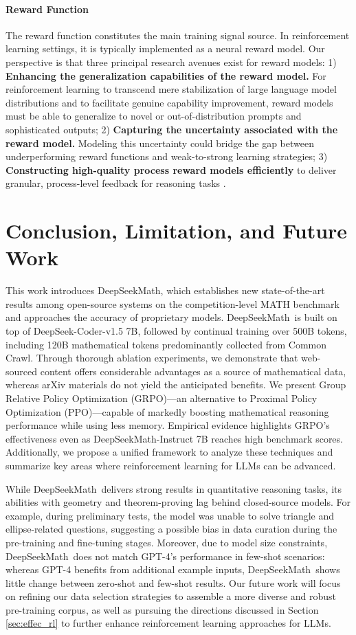 \paragraph{Reward Function} The reward function constitutes the main training signal source. In reinforcement learning settings, it is typically implemented as a neural reward model. Our perspective is that three principal research avenues exist for reward models: 1) \textbf{Enhancing the generalization capabilities of the reward model.} For reinforcement learning to transcend mere stabilization of large language model distributions and to facilitate genuine capability improvement, reward models must be able to generalize to novel or out-of-distribution prompts and sophisticated outputs; 2) \textbf{Capturing the uncertainty associated with the reward model.} Modeling this uncertainty could bridge the gap between underperforming reward functions and weak-to-strong learning strategies; 3) \textbf{Constructing high-quality process reward models efficiently} to deliver granular, process-level feedback for reasoning tasks \citep{lightman2023let,wang2023math}.

\section{Conclusion, Limitation, and Future Work} 

This work introduces DeepSeekMath, which establishes new state-of-the-art results among open-source systems on the competition-level MATH benchmark and approaches the accuracy of proprietary models. DeepSeekMath~is built on top of DeepSeek-Coder-v1.5 7B, followed by continual training over 500B tokens, including 120B mathematical tokens predominantly collected from Common Crawl. Through thorough ablation experiments, we demonstrate that web-sourced content offers considerable advantages as a source of mathematical data, whereas arXiv materials do not yield the anticipated benefits. We present Group Relative Policy Optimization (GRPO)—an alternative to Proximal Policy Optimization (PPO)—capable of markedly boosting mathematical reasoning performance while using less memory. Empirical evidence highlights GRPO’s effectiveness even as DeepSeekMath-Instruct 7B reaches high benchmark scores. Additionally, we propose a unified framework to analyze these techniques and summarize key areas where reinforcement learning for LLMs can be advanced.

While DeepSeekMath~delivers strong results in quantitative reasoning tasks, its abilities with geometry and theorem-proving lag behind closed-source models. For example, during preliminary tests, the model was unable to solve triangle and ellipse-related questions, suggesting a possible bias in data curation during the pre-training and fine-tuning stages. Moreover, due to model size constraints, DeepSeekMath~does not match GPT-4’s performance in few-shot scenarios: whereas GPT-4 benefits from additional example inputs, DeepSeekMath~shows little change between zero-shot and few-shot results. Our future work will focus on refining our data selection strategies to assemble a more diverse and robust pre-training corpus, as well as pursuing the directions discussed in Section \ref{sec:effec_rl} to further enhance reinforcement learning approaches for LLMs.